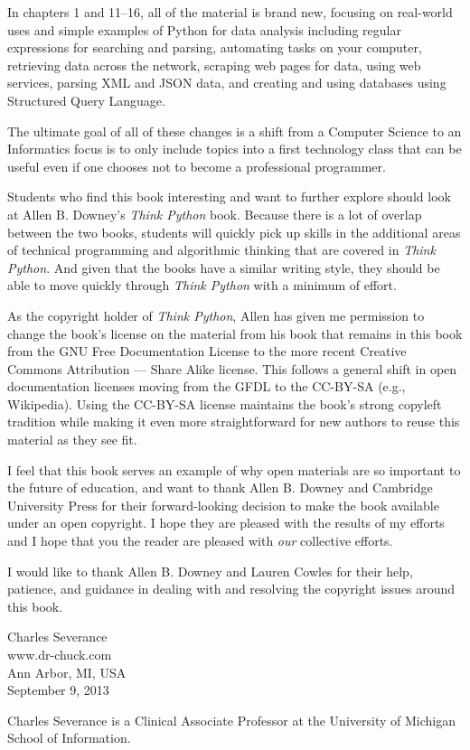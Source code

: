In chapters 1 and 11--16, all of the material is brand new, focusing
on real-world uses and simple examples of Python for data analysis 
including regular expressions for searching and parsing, 
automating tasks on your computer, retrieving data across 
the network, scraping web pages for data, 
using web services, parsing XML and JSON data, and creating 
and using databases using Structured Query Language.

The ultimate goal of all of these changes is a shift from a 
Computer Science to an Informatics
focus is to only include topics into a first technology 
class that can be useful even if one chooses not to 
become a professional programmer.

Students who find this book interesting and want to further explore
should look at Allen B. Downey's \emph{Think Python} book.  Because there
is a lot of overlap between the two books,
students will quickly pick up skills in the additional
areas of technical programming and algorithmic thinking 
that are covered in \emph{Think Python}.
And given that the books have a similar writing style, they should be 
able to move quickly through \emph{Think Python} with a minimum of effort.

As the copyright holder of \emph{Think Python},
Allen has given me permission to change the book's license 
on the material from his book that remains in this book
from the
GNU Free Documentation License 
to the more recent
Creative Commons Attribution --- Share Alike
license.
This follows a general shift in open documentation licenses moving 
from the GFDL to the CC-BY-SA (e.g., Wikipedia).
Using the CC-BY-SA license maintains the book's 
strong copyleft tradition while making it even more straightforward 
for new authors to reuse this material as they see fit.

I feel that this book serves an example of why open 
materials are so important to the future of education,
and want to thank Allen B. Downey and Cambridge University
Press for their forward-looking decision to make the book available
under an open copyright.   I hope they are pleased with the 
results of my efforts and I hope that you the reader are pleased with
\emph{our} collective efforts.

I would like to thank Allen B. Downey and Lauren Cowles for their help,
patience, and guidance in dealing with and resolving the copyright 
issues around this book.

Charles Severance\\
www.dr-chuck.com\\
Ann Arbor, MI, USA\\
September 9, 2013

Charles Severance is a 
Clinical Associate Professor 
at the University of Michigan School of Information.

\clearemptydoublepage
